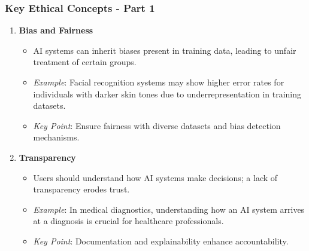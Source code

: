 \documentclass[aspectratio=169]{beamer}
\begin{document}
\begin{frame}[fragile]
    \frametitle{Key Ethical Concepts - Part 1}
    \begin{enumerate}
        \item \textbf{Bias and Fairness}
        \begin{itemize}
            \item AI systems can inherit biases present in training data, leading to unfair treatment of certain groups.
            \item \textit{Example}: Facial recognition systems may show higher error rates for individuals with darker skin tones due to underrepresentation in training datasets.
            \item \textit{Key Point}: Ensure fairness with diverse datasets and bias detection mechanisms.
        \end{itemize}
        
        \item \textbf{Transparency}
        \begin{itemize}
            \item Users should understand how AI systems make decisions; a lack of transparency erodes trust.
            \item \textit{Example}: In medical diagnostics, understanding how an AI system arrives at a diagnosis is crucial for healthcare professionals.
            \item \textit{Key Point}: Documentation and explainability enhance accountability.
        \end{itemize}      
    \end{enumerate}
\end{frame}
\end{document}
